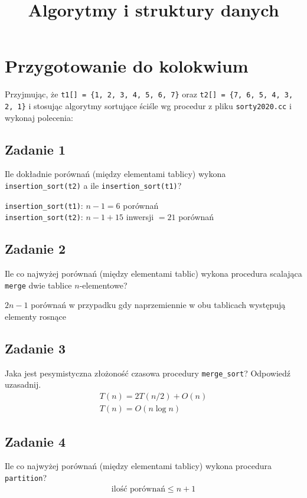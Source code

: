 \documentclass{article}
\begin{document}
\title{Algorytmy i struktury danych}
\author{}
\date{}
\maketitle

\section*{Przygotowanie do kolokwium}
Przyjmując, że \verb+t1[] = {1, 2, 3, 4, 5, 6, 7}+ oraz \verb+t2[] = {7, 6, 5, 4, 3, 2, 1}+ i stosując algorytmy
sortujące ściśle wg procedur z pliku \verb+sorty2020.cc+ i wykonaj polecenia:

\subsection*{Zadanie 1}
Ile dokładnie porównań (między elementami tablicy) wykona \verb+insertion_sort(t2)+ a ile \verb+insertion_sort(t1)+?
\begin{center}
    \verb|insertion_sort(t1)|: $n-1 = 6$ porównań \\
    \verb|insertion_sort(t2)|: $n-1 + 15$ inwersji $= 21$ porównań
\end{center}

\subsection*{Zadanie 2}
Ile co najwyżej porównań (między elementami tablic) wykona procedura scalająca \verb+merge+
dwie tablice $n$-elementowe?
\begin{center}
    $2n-1$ porównań w przypadku gdy naprzemiennie w obu tablicach występują elementy rosnące
\end{center}

\subsection*{Zadanie 3}
Jaka jest pesymistyczna złożoność czasowa procedury \verb+merge_sort+? Odpowiedź uzasadnij.
\begin{gather*}
    T(n) = 2T(n/2) + O(n) \\
    T(n) = O(n \log n)
\end{gather*}

\subsection*{Zadanie 4}
Ile co najwyżej porównań (między elementami tablicy) wykona procedura \verb+partition+?
\begin{gather*}
    \text{ilość porównań} \leq n+1
\end{gather*}
\end{document}
